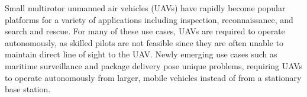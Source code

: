
Small multirotor unmanned air vehicles (UAVs) have rapidly become popular platforms for
a variety of applications including
inspection, reconnaissance, and search and rescue.
For many of these use cases, UAVs are required to operate
autonomously, as skilled pilots are not feasible
since they are often unable to maintain direct line of sight to the UAV.
Newly emerging use cases such as maritime surveillance and package delivery
pose unique problems, requiring UAVs to operate autonomously from larger,
mobile vehicles instead of from a stationary base station.



